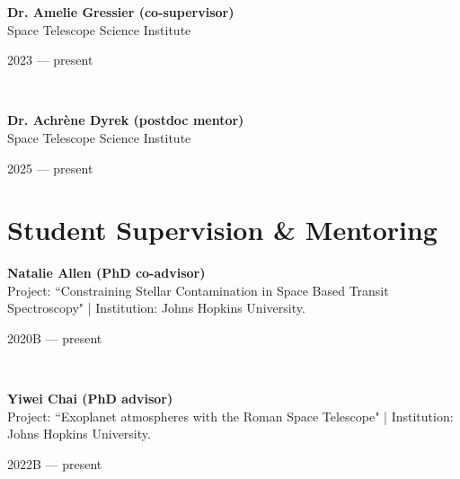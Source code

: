 \documentclass[12pt, a4paper]{article} %
\begin{document}
\begin{minipage}[t]{0.7\textwidth}
\begin{flushleft}%
  \setlength{\leftskip}{0.2cm}%
\textbf{Dr. Amelie Gressier (co-supervisor)}\\
Space Telescope Science Institute
\end{flushleft}
\end{minipage}
\begin{minipage}[t]{0.3\textwidth}
\hfill 2023 --- present
\end{minipage}\\

\begin{minipage}[t]{0.7\textwidth}
\begin{flushleft}%
  \setlength{\leftskip}{0.2cm}%
\textbf{Dr. Achr\`ene Dyrek (postdoc mentor)}\\
Space Telescope Science Institute
\end{flushleft}
\end{minipage}
\begin{minipage}[t]{0.3\textwidth}
\hfill 2025 --- present
\end{minipage}

\section*{Student Supervision \& Mentoring}

\begin{minipage}[t]{0.7\textwidth}
\begin{flushleft}%
  \setlength{\leftskip}{0.2cm}%
\textbf{Natalie Allen (PhD co-advisor)}\\
Project: ``Constraining Stellar Contamination in Space Based Transit Spectroscopy" | Institution: Johns Hopkins University.
\end{flushleft}
\end{minipage}
\begin{minipage}[t]{0.3\textwidth}
\hfill 2020B --- present
\end{minipage}\\

\begin{minipage}[t]{0.7\textwidth}
\begin{flushleft}%
  \setlength{\leftskip}{0.2cm}%
\textbf{Yiwei Chai (PhD advisor)}\\
Project: ``Exoplanet atmospheres with the Roman Space Telescope" | Institution: Johns Hopkins University.
\end{flushleft}
\end{minipage}
\begin{minipage}[t]{0.3\textwidth}
\hfill 2022B --- present
\end{minipage}\\
\end{document}

